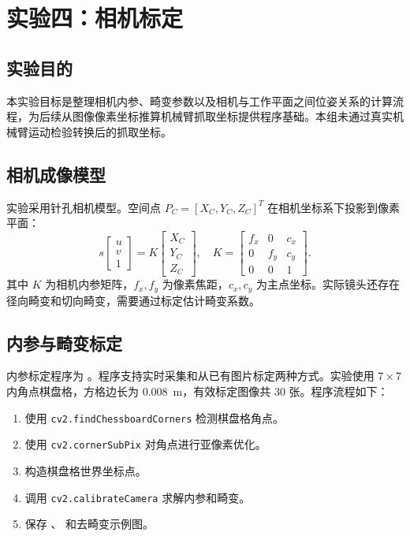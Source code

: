 \section{实验四：相机标定}

\subsection{实验目的}

本实验目标是整理相机内参、畸变参数以及相机与工作平面之间位姿关系的计算流程，为后续从图像像素坐标推算机械臂抓取坐标提供程序基础。本组未通过真实机械臂运动检验转换后的抓取坐标。

\subsection{相机成像模型}

实验采用针孔相机模型。空间点 $P_C=[X_C,Y_C,Z_C]^T$ 在相机坐标系下投影到像素平面：
\[
s
\begin{bmatrix}
u\\v\\1
\end{bmatrix}
=
K
\begin{bmatrix}
X_C\\Y_C\\Z_C
\end{bmatrix},
\quad
K=
\begin{bmatrix}
f_x&0&c_x\\
0&f_y&c_y\\
0&0&1
\end{bmatrix}.
\]
其中 $K$ 为相机内参矩阵，$f_x,f_y$ 为像素焦距，$c_x,c_y$ 为主点坐标。实际镜头还存在径向畸变和切向畸变，需要通过标定估计畸变系数。

\subsection{内参与畸变标定}

内参标定程序为 。程序支持实时采集和从已有图片标定两种方式。实验使用 $7\times7$ 内角点棋盘格，方格边长为 \SI{0.008}{m}，有效标定图像共 30 张。程序流程如下：

\begin{enumerate}
  \item 使用 \texttt{cv2.findChessboardCorners} 检测棋盘格角点。
  \item 使用 \texttt{cv2.cornerSubPix} 对角点进行亚像素优化。
  \item 构造棋盘格世界坐标点。
  \item 调用 \texttt{cv2.calibrateCamera} 求解内参和畸变。
  \item 保存 、 和去畸变示例图。
\end{enumerate}

